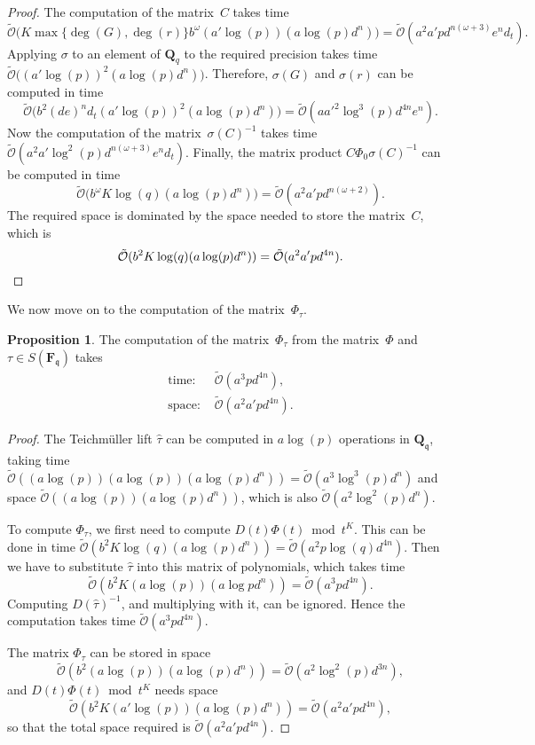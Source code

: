 \documentclass[a4paper,11pt]{article}
\numberwithin{equation}{section}
\newcommand{\QQ}{\mathbf{Q}} %
\newcommand{\FF}{\mathbf{F}} %
\providecommand{\SoftOh}{\tilde{\mathcal{O}}} %
\theoremstyle{definition}
\newtheorem{prop}[thm]{Proposition}
\begin{document}
\begin{proof}
The computation of the matrix~$C$ takes time
\[
\SoftOh\bigl(K \max\{\deg(G),\deg(r)\} b^{\omega} (a'\log(p)) (a \log(p) d^n)\bigr) = 
\SoftOh(a^2 a' p d^{n(\omega+3)}e^n d_t).
\] 
Applying $\sigma$ to an element of $\QQ_q$ to the required precision
takes time $\SoftOh\bigl((a' \log(p))^2(a\log(p)d^n)\bigr)$. Therefore, 
$\sigma(G)$ and $\sigma(r)$ can be computed in time 
\[
\SoftOh\bigl(b^2 (de)^n d_t (a' \log(p))^2 (a\log(p)d^n)\bigr) = 
\SoftOh(a a'^2 \log^3(p) d^{4n} e^n ).
\] 
Now the computation of the matrix~$\sigma(C)^{-1}$ takes time 
$\SoftOh(a^2 a' \log^2(p) d^{n(\omega+3)}e^n d_t)$. Finally, 
the matrix product $C \Phi_0 \sigma(C)^{-1}$ can be computed in time 
\[
\SoftOh\bigl(b^{\omega} K \log(q) (a \log(p) d^n)\bigr) = \SoftOh(a^2 a' p d^{n(\omega+2)}).
\]
The required space is dominated by the space needed to store the 
matrix~$C$, which is
\[
\SoftOh(b^2 K \log(q) (a \log(p) d^n)) = \SoftOh(a^2 a' p d^{4n}). \qedhere
\]
\end{proof}

We now move on to the computation of the matrix~$\Phi_{\tau}$.

\begin{prop}
The computation of the matrix~$\Phi_{\tau}$ from the matrix~$\Phi$ 
and $\tau \in S(\FF_{\mathfrak{q}})$ takes
\begin{align*}
\mbox{time: }  &\SoftOh(a^3 p d^{4n}), \\
\mbox{space: } &\SoftOh(a^2 a' p d^{4n}).
\end{align*}
\end{prop}

\begin{proof}
The Teichm\"uller lift $\hat{\tau}$ can be computed in $a \log(p)$ 
operations in $\QQ_{\mathfrak{q}}$, taking time 
$\SoftOh((a \log(p))(a \log(p)) (a \log(p) d^n)) = \SoftOh(a^3 \log^3(p) d^n)$ 
and space $\SoftOh((a \log(p)) (a \log(p) d^n))$, which is also 
$\SoftOh(a^2 \log^2(p) d^n)$. 

To compute $\Phi_{\tau}$, we first need to compute 
$D(t) \Phi(t) \bmod{t^{K}}$. This can be done in time 
$\SoftOh(b^2 K \log(q) (a \log(p) d^n)) = \SoftOh(a^2 p \log(q) d^{4n})$.
Then we have to substitute $\hat{\tau}$ into this matrix of polynomials, 
which takes time
\[
\SoftOh(b^2 K (a \log(p)) (a \log p d^n)) = \SoftOh(a^3 p d^{4n}).
\]
Computing $D(\hat{\tau})^{-1}$, and multiplying with it, can be ignored. 
Hence the computation takes time $\SoftOh(a^3 p d^{4n})$.

The matrix $\Phi_{\tau}$ can be stored in space
\[
\SoftOh(b^2 (a \log(p))(a \log(p) d^n)) = \SoftOh(a^2 \log^2(p) d^{3n}),
\]
and $D(t) \Phi(t) \bmod{t^{K}}$ needs space
 \[
\SoftOh(b^2 K (a' \log(p)) (a \log(p) d^n)) = \SoftOh(a^2 a' p d^{4n}),
\]
so that the total space required is $\SoftOh(a^2 a' p d^{4n})$.
\end{proof}
\end{document}
